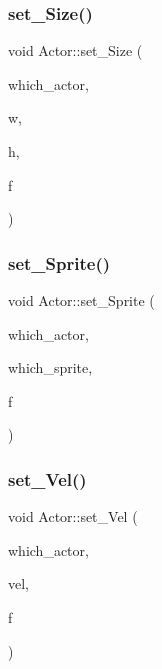 \mbox{\label{namespace_actor_a4a9e57d332e039598f1acfb74da419a5}} 
\subsubsection{\texorpdfstring{set\+\_\+\+Size()}{set\_Size()}}
{\footnotesize\ttfamily void Actor\+::set\+\_\+\+Size (\begin{DoxyParamCaption}\item[{int}]{which\+\_\+actor,  }\item[{float}]{w,  }\item[{float}]{h,  }\item[{\mbox{\hyperlink{struct_actor_1_1_factory}{Factory}} $\ast$}]{f }\end{DoxyParamCaption})}

\mbox{\label{namespace_actor_a62906af5de2990ca58baae369a2912fc}} 
\subsubsection{\texorpdfstring{set\+\_\+\+Sprite()}{set\_Sprite()}}
{\footnotesize\ttfamily void Actor\+::set\+\_\+\+Sprite (\begin{DoxyParamCaption}\item[{int}]{which\+\_\+actor,  }\item[{int}]{which\+\_\+sprite,  }\item[{\mbox{\hyperlink{struct_actor_1_1_factory}{Factory}} $\ast$}]{f }\end{DoxyParamCaption})}

\mbox{\label{namespace_actor_a6cbf0e6df03f13dda762a664c4b8170d}} 
\subsubsection{\texorpdfstring{set\+\_\+\+Vel()}{set\_Vel()}}
{\footnotesize\ttfamily void Actor\+::set\+\_\+\+Vel (\begin{DoxyParamCaption}\item[{int}]{which\+\_\+actor,  }\item[{const \mbox{\hyperlink{struct_vec2_d_1_1_vec2_d}{Vec2\+D\+::\+Vec2D}} $\ast$}]{vel,  }\item[{\mbox{\hyperlink{struct_actor_1_1_factory}{Factory}} $\ast$}]{f }\end{DoxyParamCaption})}

